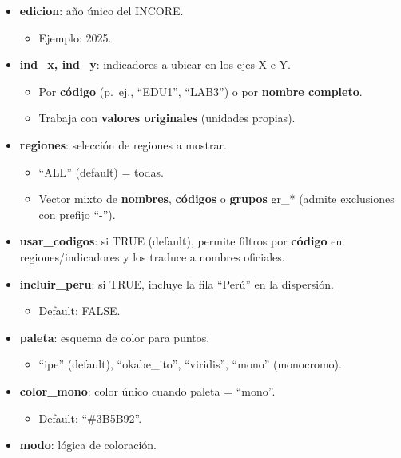 \documentclass[
  11pt,
  letterpaper,
  DIV=11,
  numbers=noendperiod]{scrartcl}
\providecommand{\tightlist}{%
  \setlength{\itemsep}{0pt}\setlength{\parskip}{0pt}}\usepackage{longtable,booktabs,array}
\begin{document}
\begin{itemize}
\item
  \textbf{edicion}: año único del INCORE.

  \begin{itemize}
  \tightlist
  \item
    Ejemplo: 2025.
  \end{itemize}
\item
  \textbf{ind\_x, ind\_y}: indicadores a ubicar en los ejes X e Y.

  \begin{itemize}
  \item
    Por \textbf{código} (p.~ej., ``EDU1'', ``LAB3'') o por
    \textbf{nombre completo}.
  \item
    Trabaja con \textbf{valores originales} (unidades propias).
  \end{itemize}
\item
  \textbf{regiones}: selección de regiones a mostrar.

  \begin{itemize}
  \item
    ``ALL'' (default) = todas.
  \item
    Vector mixto de \textbf{nombres}, \textbf{códigos} o \textbf{grupos}
    gr\_* (admite exclusiones con prefijo ``-'').
  \end{itemize}
\item
  \textbf{usar\_codigos}: si TRUE (default), permite filtros por
  \textbf{código} en regiones/indicadores y los traduce a nombres
  oficiales.
\item
  \textbf{incluir\_peru}: si TRUE, incluye la fila ``Perú'' en la
  dispersión.

  \begin{itemize}
  \tightlist
  \item
    Default: FALSE.
  \end{itemize}
\item
  \textbf{paleta}: esquema de color para puntos.

  \begin{itemize}
  \tightlist
  \item
    ``ipe'' (default), ``okabe\_ito'', ``viridis'', ``mono''
    (monocromo).
  \end{itemize}
\item
  \textbf{color\_mono}: color único cuando paleta = ``mono''.

  \begin{itemize}
  \tightlist
  \item
    Default: ``\#3B5B92''.
  \end{itemize}
\item
  \textbf{modo}: lógica de coloración.


\end{itemize}
\end{document}
